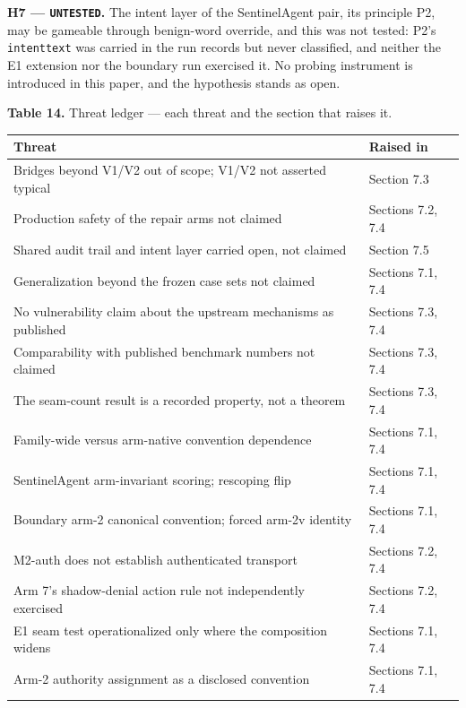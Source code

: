 \documentclass[
  10pt,
]{article}
\newcounter{none} %
\renewcommand{\_}{\origunderscore\allowbreak}
\begin{document}
\textbf{H7 --- \texttt{UNTESTED}.} The intent layer of the SentinelAgent
pair, its principle P2, may be gameable through benign-word override,
and this was not tested: P2's \texttt{intent\_text} was carried in the
run records but never classified, and neither the E1 extension nor the
boundary run exercised it. No probing instrument is introduced in this
paper, and the hypothesis stands as open.

\textbf{Table 14.} Threat ledger --- each threat and the section that
raises it.

{\def\LTcaptype{none} %
\begin{longtable}[]{@{}
  >{\raggedright\arraybackslash}p{}
  >{\raggedright\arraybackslash}p{}@{}}
\toprule\noalign{}
\begin{minipage}[b]{\linewidth}\raggedright
Threat
\end{minipage} & \begin{minipage}[b]{\linewidth}\raggedright
Raised in
\end{minipage} \\
\midrule\noalign{}
\endhead
\bottomrule\noalign{}
\endlastfoot
Bridges beyond V1/V2 out of scope; V1/V2 not asserted typical & Section
7.3 \\
Production safety of the repair arms not claimed & Sections 7.2, 7.4 \\
Shared audit trail and intent layer carried open, not claimed & Section
7.5 \\
Generalization beyond the frozen case sets not claimed & Sections 7.1,
7.4 \\
No vulnerability claim about the upstream mechanisms as published &
Sections 7.3, 7.4 \\
Comparability with published benchmark numbers not claimed & Sections
7.3, 7.4 \\
The seam-count result is a recorded property, not a theorem & Sections
7.3, 7.4 \\
Family-wide versus arm-native convention dependence & Sections 7.1,
7.4 \\
SentinelAgent arm-invariant scoring; rescoping flip & Sections 7.1,
7.4 \\
Boundary arm-2 canonical convention; forced arm-2v identity & Sections
7.1, 7.4 \\
M2-auth does not establish authenticated transport & Sections 7.2,
7.4 \\
Arm 7's shadow-denial action rule not independently exercised & Sections
7.2, 7.4 \\
E1 seam test operationalized only where the composition widens &
Sections 7.1, 7.4 \\
Arm-2 authority assignment as a disclosed convention & Sections 7.1,
7.4 \\
\end{longtable}
}
\end{document}
